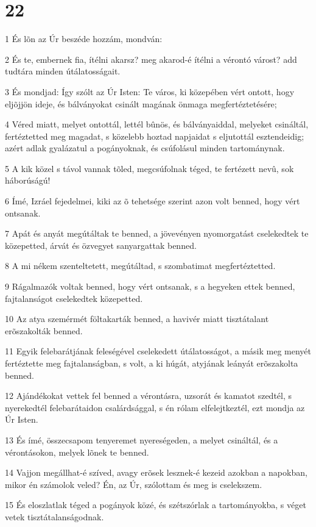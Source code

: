 \chapter{22}

\par 1 És lõn az Úr beszéde hozzám, mondván:
\par 2 És te, embernek fia, ítélni akarsz? meg akarod-é ítélni a vérontó várost? add tudtára minden útálatosságait.
\par 3 És mondjad: Így szólt az Úr Isten: Te város, ki közepében vért ontott, hogy eljõjjön ideje, és bálványokat csinált magának önmaga megfertéztetésére;
\par 4 Véred miatt, melyet ontottál, lettél bûnös, és bálványaiddal, melyeket csináltál, fertéztetted meg magadat, s közelebb hoztad napjaidat s eljutottál esztendeidig; azért adlak gyalázatul a pogányoknak, és csúfolásul minden tartománynak.
\par 5 A kik közel s távol vannak tõled, megcsúfolnak téged, te fertézett nevû, sok háborúságú!
\par 6 Ímé, Izráel fejedelmei, kiki az õ tehetsége szerint azon volt benned, hogy vért ontsanak.
\par 7 Apát és anyát megútáltak te benned, a jövevényen nyomorgatást cselekedtek te közepetted, árvát és özvegyet sanyargattak benned.
\par 8 A mi nékem szenteltetett, megútáltad, s szombatimat megfertéztetted.
\par 9 Rágalmazók voltak benned, hogy vért ontsanak, s a hegyeken ettek benned, fajtalanságot cselekedtek közepetted.
\par 10 Az atya szemérmét föltakarták benned, a havivér miatt tisztátalant erõszakolták benned.
\par 11 Egyik felebarátjának feleségével cselekedett útálatosságot,  a másik meg menyét fertéztette meg fajtalanságban, s volt, a ki húgát, atyjának leányát erõszakolta benned.
\par 12 Ajándékokat vettek fel benned a vérontásra, uzsorát és kamatot szedtél, s nyerekedtél felebarátaidon csalárdsággal, s én rólam elfelejtkeztél, ezt mondja az Úr Isten.
\par 13 És ímé, összecsapom tenyeremet nyereségeden, a melyet csináltál, és a vérontásokon, melyek lõnek te benned.
\par 14 Vajjon megállhat-é szíved, avagy erõsek lesznek-é kezeid azokban a napokban, mikor én számolok veled? Én, az Úr, szólottam és meg is cselekszem.
\par 15 És eloszlatlak téged a pogányok közé, és szétszórlak a tartományokba, s véget vetek tisztátalanságodnak.
